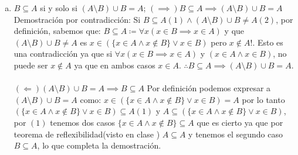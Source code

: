 \begin{enumerate}[(a)]
     \item $B \subseteq A$ si y solo si $ (A \setminus B) \cup B = A$; \newline
    $(\implies) B \subseteq A \implies (A \setminus B) \cup B = A$\newline
    Demostración por contradicción:\newline
    Si $B \subseteq A(1) \wedge (A \setminus B) \cup B \neq A(2)$, por definición, sabemos que:\newline
    $B \subseteq A \coloneqq \forall x (x \in B \implies x \in A)$ \newline
    y que $(A \setminus B) \cup B \neq A$ es $x \in (\{x \in A \wedge x \notin B \} \lor x \in B)$ pero $x \notin A !$.\newline
    Esto es una contradicción ya que si $\forall x(x \in B \implies x \in A)$ \newline
    y $(x \in A \wedge x \in B)$, \newline
    no puede ser $x \notin A$ ya que en ambos casos $x \in A$. \newline
   $\therefore  B \subseteq A \implies (A \setminus B) \cup B = A$.\\\\
   
   $(\Longleftarrow) (A \setminus B) \cup B = A \implies B \subseteq A$\newline
   Por definición podemos expresar a  $(A \setminus B) \cup B = A$ como:\newline
    $x \in ( \{ x \in A \wedge x \notin B\} \lor x \in B) = A$ \newline
    por lo tanto $( \{x \in A \wedge x \notin B\} \lor x \in B) \subseteq A(1)$ \newline
    y $A \subseteq( \{ x \in A \wedge x \notin B \} \lor x \in B)$,\newline
     por $(1)$ tenemos dos casos $\{ x \in A \wedge x \notin B\} \subseteq A$ que es cierto ya que por teorema de reflexibilidad(visto en clase ) $A \subseteq A$ \newline
     y tenemos el segundo caso $B \subseteq A$, lo que completa la demostración.


  
  \end{enumerate}